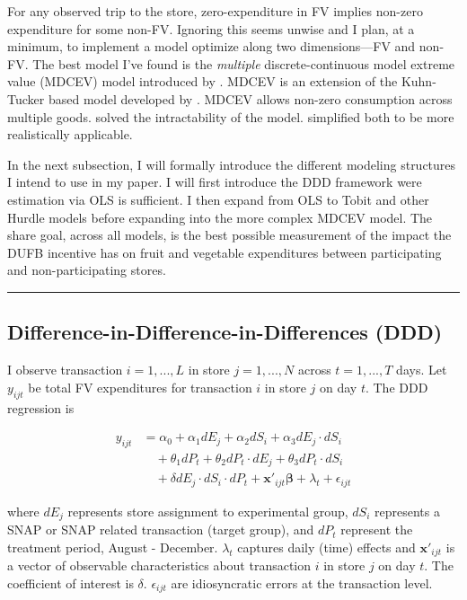 \documentclass[12pt,letterpaperpaper,]{book}
\begin{document}
For any observed trip to the store, zero-expenditure in FV implies
non-zero expenditure for some non-FV. Ignoring this seems unwise and I
plan, at a minimum, to implement a model optimize along two
dimensions---FV and non-FV. The best model I've found is the
\emph{multiple} discrete-continuous model extreme value (MDCEV) model
introduced by \citet{bhat_multiple_2005}. MDCEV is an extension of the
Kuhn-Tucker based model developed by \citet{wales_estimation_1983}.
MDCEV allows non-zero consumption across multiple goods.
\citet{kim_modeling_2002} solved the intractability of the
\citet{wales_estimation_1983} model. \citet{bhat_multiple_2005}
simplified both to be more realistically applicable.

In the next subsection, I will formally introduce the different modeling
structures I intend to use in my paper. I will first introduce the DDD
framework were estimation via OLS is sufficient. I then expand from OLS
to Tobit and other Hurdle models before expanding into the more complex
MDCEV model. The share goal, across all models, is the best possible
measurement of the impact the DUFB incentive has on fruit and vegetable
expenditures between participating and non-participating stores.

\begin{center}\rule{0.5\linewidth}{\linethickness}\end{center}

\subsection*{Difference-in-Difference-in-Differences
(DDD)}\label{difference-in-difference-in-differences-ddd}

I observe transaction \(i=1,...,L\) in store \(j=1,...,N\) across
\(t=1,...,T\) days. Let \(y_{ijt}\) be total FV expenditures for
transaction \(i\) in store \(j\) on day \(t\). The DDD regression is

\[
\begin{aligned}
y_{ijt} &= \alpha_0 + \alpha_1 dE_j + \alpha_2 dS_i  + \alpha_3 dE_j \cdot dS_i \\& \quad + \theta_1 dP_t + \theta_2 dP_t \cdot dE_j + \theta_3 dP_t \cdot dS_i \\
& \quad + \delta dE_j \cdot dS_i \cdot dP_t + \bm{x'}_{ijt} \bm{\beta} + \lambda_t + \epsilon_{ijt}
\end{aligned}
\]

where \(dE_j\) represents store assignment to experimental group,
\(dS_i\) represents a SNAP or SNAP related transaction (target group),
and \(dP_t\) represent the treatment period, August - December.
\(\lambda_t\) captures daily (time) effects and \(\bm{x'}_{ijt}\) is a
vector of observable characteristics about transaction \(i\) in store
\(j\) on day \(t\). The coefficient of interest is \(\delta\).
\(\epsilon_{ijt}\) are idiosyncratic errors at the transaction level.
\end{document}
